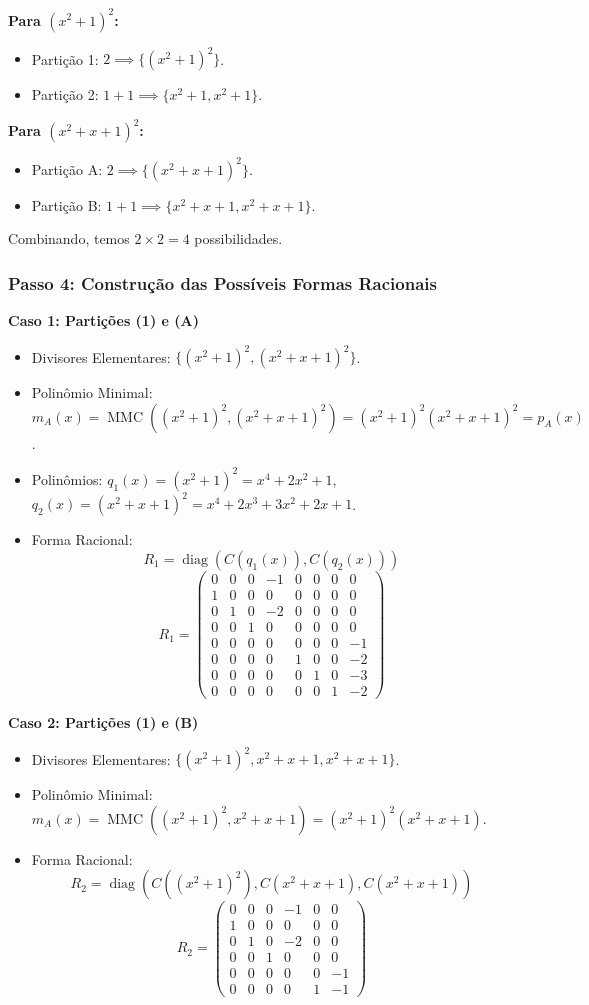 \textbf{Para $(x^2+1)^2$:}
\begin{itemize}
\item Partição 1: $2 \implies \{(x^2+1)^2\}$.
\item Partição 2: $1+1 \implies \{x^2+1, x^2+1\}$.
\end{itemize}

\textbf{Para $(x^2+x+1)^2$:}
\begin{itemize}
\item Partição A: $2 \implies \{(x^2+x+1)^2\}$.
\item Partição B: $1+1 \implies \{x^2+x+1, x^2+x+1\}$.
\end{itemize}

Combinando, temos $2\times 2 = 4$ possibilidades.

\subsubsection*{Passo 4: Construção das Possíveis Formas Racionais}

\textbf{Caso 1: Partições (1) e (A)}
\begin{itemize}
\item Divisores Elementares: $\{(x^2+1)^2, (x^2+x+1)^2\}$.
\item Polinômio Minimal: $m_A(x)=\operatorname{MMC}((x^2+1)^2,(x^2+x+1)^2)=(x^2+1)^2(x^2+x+1)^2=p_A(x)$.
\item Polinômios: $q_1(x)=(x^2+1)^2=x^4+2x^2+1$, $q_2(x)=(x^2+x+1)^2=x^4+2x^3+3x^2+2x+1$.
\item Forma Racional:
\[
R_1=\operatorname{diag}(C(q_1(x)),C(q_2(x)))
\]
\[
R_1=\begin{pmatrix}
0&0&0&-1&0&0&0&0\\
1&0&0&0&0&0&0&0\\
0&1&0&-2&0&0&0&0\\
0&0&1&0&0&0&0&0\\
0&0&0&0&0&0&0&-1\\
0&0&0&0&1&0&0&-2\\
0&0&0&0&0&1&0&-3\\
0&0&0&0&0&0&1&-2
\end{pmatrix}
\]
\end{itemize}

\textbf{Caso 2: Partições (1) e (B)}
\begin{itemize}
\item Divisores Elementares: $\{(x^2+1)^2, x^2+x+1, x^2+x+1\}$.
\item Polinômio Minimal: $m_A(x)=\operatorname{MMC}((x^2+1)^2, x^2+x+1)=(x^2+1)^2(x^2+x+1)$.
\item Forma Racional:
\[
R_2=\operatorname{diag}(C((x^2+1)^2),C(x^2+x+1),C(x^2+x+1))
\]
\[
R_2=\begin{pmatrix}
0&0&0&-1&0&0\\
1&0&0&0&0&0\\
0&1&0&-2&0&0\\
0&0&1&0&0&0\\
0&0&0&0&0&-1\\
0&0&0&0&1&-1
\end{pmatrix}
\]
\end{itemize}

